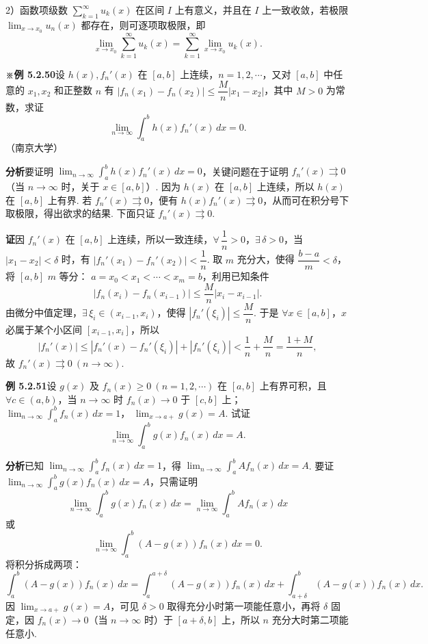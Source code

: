 \documentclass[UTF8,12pt,a4paper,fontset=fandol]{ctexart}
\begin{document}
2）函数项级数 $\displaystyle\sum_{k=1}^{\infty}u_k(x)$ 在区间 $I$ 上有意义，并且在 $I$ 上一致收敛，若极限
$\displaystyle\lim_{x\to x_0}u_n(x)$ 都存在，则可逐项取极限，即
\[
  \lim_{x\to x_0}\sum_{k=1}^{\infty}u_k(x)
  =\sum_{k=1}^{\infty}\lim_{x\to x_0}u_k(x).
\tag{C}
\]

\noindent\textbf{※例 5.2.50}\quad 设 $h(x),f_n'(x)$ 在 $[a,b]$ 上连续，$n=1,2,\cdots$，又对 $[a,b]$ 中任意的
$x_1,x_2$ 和正整数 $n$ 有
$|f_n(x_1)-f_n(x_2)|\le\dfrac Mn|x_1-x_2|$，其中 $M>0$ 为常数，求证
\[
  \lim_{n\to\infty}\int_a^b h(x)f_n'(x)\,dx=0.
\]
（南京大学）

\noindent\textbf{分析}\quad 要证明 $\displaystyle\lim_{n\to\infty}\int_a^b h(x)f_n'(x)\,dx=0$，关键问题在于证明
$f_n'(x)\rightrightarrows0$（当 $n\to\infty$ 时，关于 $x\in[a,b]$）. 因为 $h(x)$ 在 $[a,b]$ 上连续，所以
$h(x)$ 在 $[a,b]$ 上有界. 若 $f_n'(x)\rightrightarrows0$，便有
$h(x)f_n'(x)\rightrightarrows0$，从而可在积分号下取极限，得出欲求的结果. 下面只证
$f_n'(x)\rightrightarrows0$.

\noindent\textbf{证}\quad 因 $f_n'(x)$ 在 $[a,b]$ 上连续，所以一致连续，$\forall\,\dfrac1n>0$，$\exists\,\delta>0$，当
$|x_1-x_2|<\delta$ 时，有 $|f_n'(x_1)-f_n'(x_2)|<\dfrac1n$. 取 $m$ 充分大，使得
$\dfrac{b-a}{m}<\delta$，将 $[a,b]$ $m$ 等分：
$a=x_0<x_1<\cdots<x_m=b$，利用已知条件
\[
  |f_n(x_i)-f_n(x_{i-1})|\le\frac Mn|x_i-x_{i-1}|.
\]
由微分中值定理，$\exists\,\xi_i\in(x_{i-1},x_i)$，使得
$|f_n'(\xi_i)|\le\dfrac Mn$. 于是 $\forall x\in[a,b]$，$x$ 必属于某个小区间
$[x_{i-1},x_i]$，所以
\[
  |f_n'(x)|\le |f_n'(x)-f_n'(\xi_i)|+|f_n'(\xi_i)|
  <\frac1n+\frac Mn=\frac{1+M}{n},
\]
故 $f_n'(x)\rightrightarrows0\ (n\to\infty)$.

\noindent\textbf{例 5.2.51}\quad 设 $g(x)$ 及 $f_n(x)\ge0\ (n=1,2,\cdots)$ 在 $[a,b]$ 上有界可积，且
$\forall c\in(a,b)$，当 $n\to\infty$ 时 $f_n(x)\to0$ 于 $[c,b]$ 上；
$\displaystyle\lim_{n\to\infty}\int_a^b f_n(x)\,dx=1$，
$\displaystyle\lim_{x\to a+}g(x)=A$. 试证
\[
  \lim_{n\to\infty}\int_a^b g(x)f_n(x)\,dx=A.
\]

\noindent\textbf{分析}\quad 已知 $\displaystyle\lim_{n\to\infty}\int_a^b f_n(x)\,dx=1$，得
$\displaystyle\lim_{n\to\infty}\int_a^b Af_n(x)\,dx=A$. 要证
$\displaystyle\lim_{n\to\infty}\int_a^b g(x)f_n(x)\,dx=A$，只需证明
\[
  \lim_{n\to\infty}\int_a^b g(x)f_n(x)\,dx
  =\lim_{n\to\infty}\int_a^b Af_n(x)\,dx
\]
或
\[
  \lim_{n\to\infty}\int_a^b (A-g(x))f_n(x)\,dx=0.
\]
将积分拆成两项：
\[
  \int_a^b(A-g(x))f_n(x)\,dx
  =\int_a^{a+\delta}(A-g(x))f_n(x)\,dx
  +\int_{a+\delta}^b(A-g(x))f_n(x)\,dx.
\]
因 $\displaystyle\lim_{x\to a+}g(x)=A$，可见 $\delta>0$ 取得充分小时第一项能任意小，再将 $\delta$ 固定，因
$f_n(x)\to0$（当 $n\to\infty$ 时）于 $[a+\delta,b]$ 上，所以 $n$ 充分大时第二项能任意小.
\end{document}

